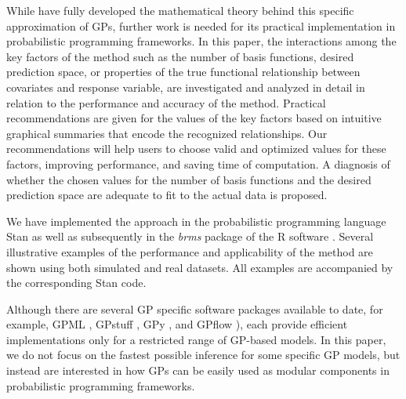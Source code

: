 \documentclass[onecolumn,a4paper,11pt]{article}
\begin{document}
While \citet{solin2018hilbert} have fully developed the mathematical theory behind this specific approximation of GPs, further work is needed for its practical implementation in probabilistic programming frameworks. In this paper, the interactions among the key factors of the method such as the number of basis functions, desired prediction space, or properties of the true functional relationship between covariates and response variable, are investigated and analyzed in detail in relation to the performance and accuracy of the method. Practical recommendations are given for the values of the key factors based on intuitive graphical summaries that encode the recognized relationships. Our recommendations will help users to choose valid and optimized values for these factors, improving performance, and saving time of computation. A diagnosis of whether the chosen values for the number of basis functions and the desired prediction space are adequate to fit to the actual data is proposed.


We have implemented the approach in the probabilistic programming language Stan \citep{carpenter2017stan} as well as subsequently in the \textit{brms} package \citep{burkner2017brms} of the R software \citep{R2019R}. Several illustrative examples of the performance and applicability of the method are shown using both simulated and real datasets. All examples are accompanied by the corresponding Stan %
code.

Although there are several GP specific software packages available to date, for example, GPML \citep{rasmussen2010gpml},  GPstuff \citep{vanhatalo2013gpstuff}, GPy \citep{gpy2014}, and GPflow \citep{GPflow2017}), each provide efficient implementations only for a restricted range of GP-based models. In this paper, we do not focus on the fastest possible inference for some specific GP models, but instead are interested in how GPs can be easily used as modular components in probabilistic programming frameworks. 
\end{document}
